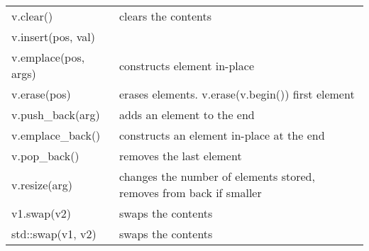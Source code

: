 \begin{center}
\begin{tabularx}{\columnwidth}{ | l  X | }
		v.clear()& clears the contents\\
		
		v.insert(pos, val) &\\
		
		v.emplace(pos, args) & constructs element in-place\\ 
		
		v.erase(pos) & erases elements. v.erase(v.begin()) first element\\
	
		v.push\_back(arg) & adds an element to the end\\
	
		v.emplace\_back() & 	constructs an element in-place at the end\\
		
		v.pop\_back() & removes the last element\\
		
		v.resize(arg) & changes the number of elements stored, removes from back if smaller\\
				
		v1.swap(v2) & swaps the contents \\
		std::swap(v1, v2) & swaps the contents \\
		\hline
	\end{tabularx}
\end{center}





